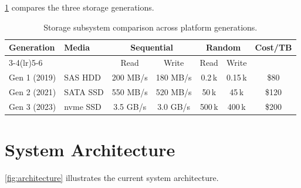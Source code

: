 \documentclass[
    language=english,
    doctype=technical-report,
    institution=none,
    titlestyle=book,
    oneside,
    loadGlossaries,
]{../../omnilatex}
\begin{document}
\cref{tab:storage-comparison} compares the three storage generations.

\begin{table}[htbp]
    \centering
    \caption{Storage subsystem comparison across platform generations.}
    \label{tab:storage-comparison}
    \begin{tabular}{@{}llccccc@{}}
        \toprule
        \multirow{2}{*}{Generation} & \multirow{2}{*}{Media}
            & \multicolumn{2}{c}{Sequential}
            & \multicolumn{2}{c}{Random}
            & \multirow{2}{*}{Cost/TB} \\
        \cmidrule(lr){3-4}\cmidrule(lr){5-6}
         & & Read & Write & Read & Write & \\
        \midrule
        Gen 1 (2019) & SAS HDD  & 200 MB/s & 180 MB/s & 0.2\,k & 0.15\,k & \$80 \\
        Gen 2 (2021) & SATA SSD & 550 MB/s & 520 MB/s & 50\,k   & 45\,k   & \$120 \\
        Gen 3 (2023) & \gls{nvme} SSD & 3.5 GB/s & 3.0 GB/s & 500\,k  & 400\,k  & \$200 \\
        \bottomrule
    \end{tabular}
\end{table}

\section{System Architecture}

\cref{fig:architecture} illustrates the current system architecture.
\end{document}
